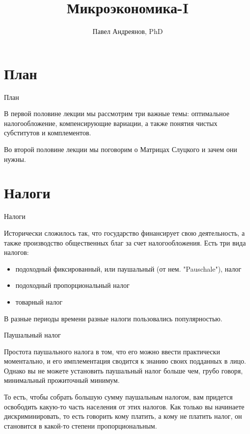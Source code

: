 \documentclass{beamer}
\title{
Микроэкономика-I
}
\author{
Павел Андреянов, PhD
}
\begin{document}
\maketitle

\section{План}

\begin{frame}{План}

В первой половине лекции мы рассмотрим три важные темы: оптимальное налогообложение, компенсирующие вариации, а также понятия чистых субститутов и комплементов.

Во второй половине лекции мы поговорим о Матрицах Слуцкого и зачем они нужны.

\end{frame}


\section{Налоги}

\begin{frame}{Налоги}

Исторически сложилось так, что государство финансирует свою деятельность, а также производство общественных благ за счет налогообложения. Есть три вида налогов:

\begin{itemize}
\item подоходный фиксированный, или паушальный (от нем. "Pauschale"), налог
\item подоходный пропорциональный налог
\item товарный налог

\end{itemize}

В разные периоды времени разные налоги пользовались популярностью. 

\end{frame}

\begin{frame}{Паушальный налог}

Простота паушального налога в том, что его можно ввести практически моментально, и его имплементация сводится к знанию своих подданных в лицо. Однако вы не можете установить паушальный налог больше чем, грубо говоря, минимальный прожиточный минимум. 

То есть, чтобы собрать большую сумму паушальным налогом, вам придется освободить какую-то часть населения от этих налогов. Как только вы начинаете дискриминировать, то есть говорить кому платить, а кому не платить налог, он становится в какой-то степени пропорциональным.

\end{frame}
\end{document}
